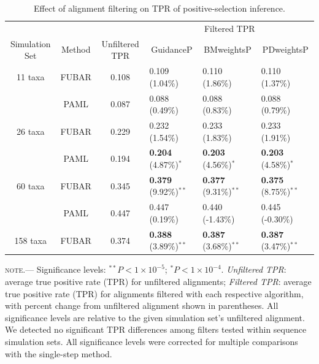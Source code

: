\documentclass[10pt]{article}
\begin{document}
\begin{table}
\caption {\label{tab:casemodel} Effect of alignment filtering on TPR of positive-selection inference.}
\begin{tabular}{c c c l l l}
\hline\noalign{\smallskip}
& & & \multicolumn{3}{c}{Filtered TPR} \\
\cline{4-6}\noalign{\smallskip}
Simulation Set & Method & Unfiltered TPR & \multicolumn{1}{c}{GuidanceP} & \multicolumn{1}{c}{BMweightsP} & \multicolumn{1}{c}{PDweightsP} \\ 
\hline\noalign{\smallskip}
11 taxa  & FUBAR & 0.108 & 0.109  (1.04\%)   & 0.110  (1.86\%)  & 0.110  (1.37\%)        \\
              & PAML &  0.087 & 0.088  (0.49\%) &  0.088  (0.83\%)   & 0.088  (0.79\%)        \\
\hline
26 taxa   & FUBAR &  0.229 & 0.232 (1.54\%)  & 0.233 (1.83\%) & 0.233 (1.91\%)         \\
              & PAML & 0.194 & \textbf{0.204} (4.87\%)$^{\ast}$ & \textbf{0.203} (4.56\%)$^{\ast}$ & \textbf{0.203} (4.58\%)$^{\ast}$   \\
\hline
60 taxa  & FUBAR & 0.345 & \textbf{0.379} (9.92\%)$^{\ast\ast}$ & \textbf{0.377} (9.31\%)$^{\ast\ast}$ & \textbf{0.375} (8.75\%)$^{\ast\ast}$  \\
              & PAML & 0.447 & 0.447 (0.19\%) & 0.440 (-1.43\%) & 0.445 (-0.30\%) \\
\hline
158 taxa & FUBAR & 0.374 & \textbf{0.388} (3.89\%)$^{\ast\ast}$ & \textbf{0.387} (3.68\%)$^{\ast\ast}$ & \textbf{0.387} (3.47\%)$^{\ast\ast}$  \\
\hline
\end{tabular}
\newline
\textsc{note.}--- Significance levels: $^{\ast\ast} P < 1\times10^{-5}$; $^{\ast} P < 1\times10^{-4}$. \textit{Unfiltered TPR}: average true positive rate (TPR) for unfiltered alignments; \textit{Filtered TPR}: average true positive rate (TPR) for alignments filtered with each respective algorithm, with percent change from unfiltered alignment shown in parentheses. All significance levels are relative to the given simulation set's unfiltered alignment. We detected no significant TPR differences among filters tested within sequence simulation sets. All significance levels were corrected for multiple comparisons with the single-step method.
\end{table}
\end{document}

